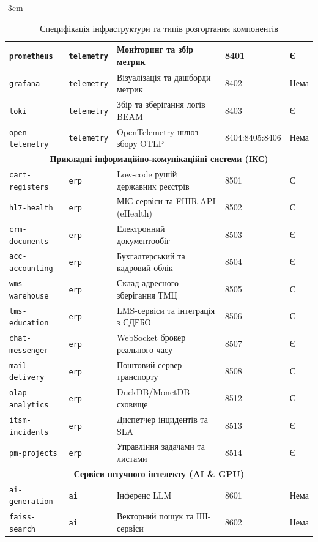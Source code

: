 \begin{table}[h!]
\begin{adjustwidth}{-3cm}{}
\begin{tabular}{|l|l|p{5cm}|l|l|}
\texttt{prometheus}        & \texttt{telemetry} & Моніторинг та збір метрик         & 8401 & Є \\ \hline
\texttt{grafana}           & \texttt{telemetry} & Візуалізація та дашборди метрик   & 8402 & Нема \\ \hline
\texttt{loki}              & \texttt{telemetry} & Збір та зберігання логів BEAM     & 8403 & Є \\ \hline
\texttt{open-telemetry}    & \texttt{telemetry} & OpenTelemetry шлюз збору OTLP     & 8404:8405:8406 & Нема \\ \hline
\hline
\multicolumn{5}{|c|}{\textbf{Прикладні інформаційно-комунікаційні системи (ІКС)}} \\ \hline
\texttt{cart-registers}    & \texttt{erp}       & Low-code рушій державних реєстрів & 8501 & Є \\ \hline
\texttt{hl7-health}        & \texttt{erp}       & МІС-сервіси та FHIR API (eHealth) & 8502 & Є \\ \hline
\texttt{crm-documents}     & \texttt{erp}       & Електронний документообіг         & 8503 & Є \\ \hline
\texttt{acc-accounting}    & \texttt{erp}       & Бухгалтерський та кадровий облік  & 8504 & Є \\ \hline
\texttt{wms-warehouse}     & \texttt{erp}       & Склад адресного зберігання ТМЦ    & 8505 & Є \\ \hline
\texttt{lms-education}     & \texttt{erp}       & LMS-сервіси та інтеграція з ЄДЕБО & 8506 & Є \\ \hline
\texttt{chat-messenger}    & \texttt{erp}       & WebSocket брокер реального часу   & 8507 & Є \\ \hline
\texttt{mail-delivery}     & \texttt{erp}       & Поштовий сервер транспорту        & 8508 & Є \\ \hline
\texttt{olap-analytics}    & \texttt{erp}       & DuckDB/MonetDB сховище            & 8512 & Є \\ \hline
\texttt{itsm-incidents}    & \texttt{erp}       & Диспетчер інцидентів та SLA       & 8513 & Є \\ \hline
\texttt{pm-projects}       & \texttt{erp}       & Управління задачами та листами    & 8514 & Є \\ \hline
\hline
\multicolumn{5}{|c|}{\textbf{Сервіси штучного інтелекту (AI \& GPU)}} \\ \hline
\texttt{ai-generation} & \texttt{ai} &  Інференс LLM & 8601 & Нема \\ \hline
\texttt{faiss-search} & \texttt{ai} & Векторний пошук та ШІ-сервіси & 8602 & Нема \\ \hline
\end{tabular}
\end{adjustwidth}
\caption{Специфікація інфраструктури та типів розгортання компонентів}
\label{tab:infrastructure}
\end{table}

